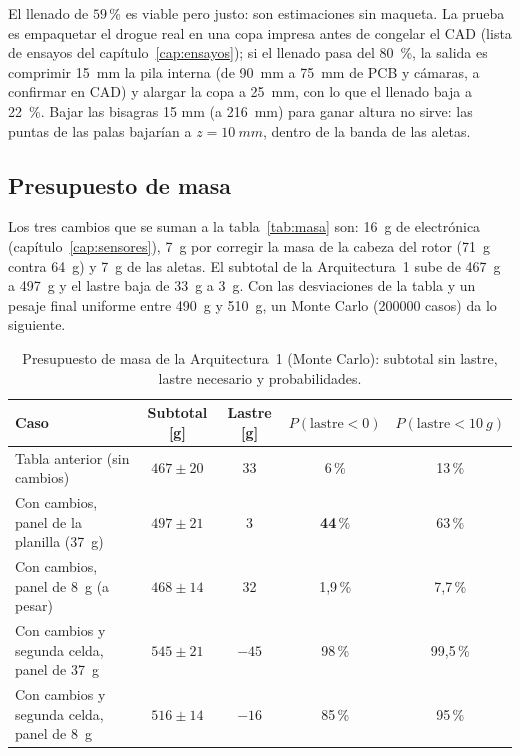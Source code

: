 El llenado de $59$\,\% es viable pero justo: son estimaciones sin maqueta. La prueba es empaquetar el
drogue real en una copa impresa antes de congelar el CAD (lista de ensayos del
capítulo~\ref{cap:ensayos}); si el llenado pasa del \SI{80}{\percent}, la salida es comprimir
\SI{15}{mm} la pila interna (de \SI{90}{mm} a \SI{75}{mm} de PCB y cámaras, a confirmar en CAD) y alargar la copa a
\SI{25}{mm}, con lo que el llenado baja a \SI{22}{\percent}. Bajar las bisagras 15 mm (a \SI{216}{mm}) para ganar
altura no sirve: las puntas de las palas bajarían a $z=\SI{10}{mm}$, dentro de la banda de las aletas.

\subsection{Presupuesto de masa}
Los tres cambios que se suman a la tabla~\ref{tab:masa} son: \SI{+16}{g} de electrónica
(capítulo~\ref{cap:sensores}), \SI{+7}{g} por corregir la masa de la cabeza del rotor
(\SI{71}{g} contra \SI{64}{g}) y \SI{+7}{g} de las aletas. El subtotal de la Arquitectura~1 sube de \SI{467}{g} a
\SI{497}{g} y el lastre baja de \SI{33}{g} a \SI{3}{g}. Con las desviaciones de la tabla y un
pesaje final uniforme entre \SI{490}{g} y \SI{510}{g}, un Monte Carlo (\num{200000} casos)
da lo siguiente.

\begin{table}[H]
\centering\small
\caption{Presupuesto de masa de la Arquitectura~1 (Monte Carlo): subtotal sin lastre,
lastre necesario y probabilidades.}\label{tab:arq-masa-mc}
\begin{tabular}{@{}lcccc@{}}
\toprule
\textbf{Caso} & \textbf{Subtotal} [g] & \textbf{Lastre} [g] & $P(\text{lastre}<0)$ & $P(\text{lastre}<\SI{10}{g})$\\\midrule
Tabla anterior (sin cambios)                     & $467\pm20$ & 33  & 6\,\%  & 13\,\%\\
Con cambios, panel de la planilla (\SI{37}{g})   & $497\pm21$ & 3   & \textbf{44}\,\% & 63\,\%\\
Con cambios, panel de \SI{8}{g} (a pesar)        & $468\pm14$ & 32  & 1,9\,\% & 7,7\,\%\\
Con cambios y segunda celda, panel de \SI{37}{g} & $545\pm21$ & $-45$ & 98\,\% & 99,5\,\%\\
Con cambios y segunda celda, panel de \SI{8}{g}  & $516\pm14$ & $-16$ & 85\,\% & 95\,\%\\
\bottomrule
\end{tabular}
\end{table}

